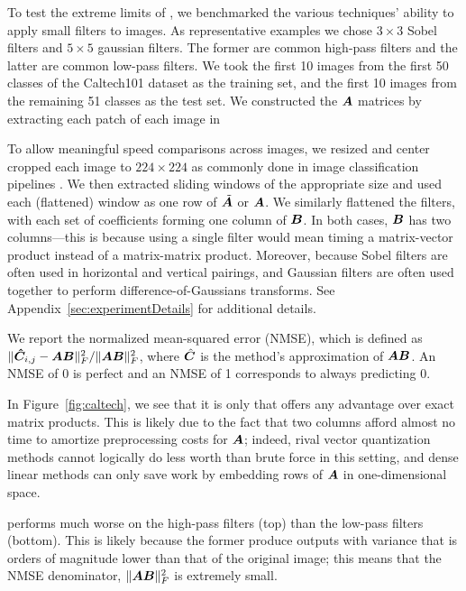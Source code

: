 To test the extreme limits of \ours, we benchmarked the various techniques' ability to apply small filters to images. As representative examples we chose $3 \times 3$ Sobel filters and $5 \times 5$ gaussian filters. The former are common high-pass filters and the latter are common low-pass filters. We took the first 10 images from the first 50 classes of the Caltech101 dataset as the training set, and the first 10 images from the remaining 51 classes as the test set. We constructed the $\bm{A}$ matrices by extracting each patch of each image in

To allow meaningful speed comparisons across images, we resized and center cropped each image to $224 \times 224$ as commonly done in image classification pipelines \cite{resNet,resnet2,densenet}. We then extracted sliding windows of the appropriate size and used each (flattened) window as one row of $\tilde{\bm{A}}$ or $\bm{A}$. We similarly flattened the filters, with each set of coefficients forming one column of $\bm{B}$. In both cases, $\bm{B}$ has two columns---this is because using a single filter would mean timing a matrix-vector product instead of a matrix-matrix product. Moreover, because Sobel filters are often used in horizontal and vertical pairings, and Gaussian filters are often used together to perform difference-of-Gaussians transforms. See Appendix~\ref{sec:experimentDetails} for additional details.

We report the normalized mean-squared error (NMSE), which is defined as $\lVert\bm{\hat{C}}_{i,j} - \bm{A}\bm{B}\rVert^2_F / \lVert\bm{A}\bm{B}\rVert^2_F$, where $\hat{\bm{C}}$ is the method's approximation of $\bm{A}\bm{B}$. An NMSE of 0 is perfect and an NMSE of 1 corresponds to always predicting 0.

In Figure~\ref{fig:caltech}, we see that it is only \oursp that offers any advantage over exact matrix products. This is likely due to the fact that two columns afford almost no time to amortize preprocessing costs for $\bm{A}$; indeed, rival vector quantization methods cannot logically do less worth than brute force in this setting, and dense linear methods can only save work by embedding rows of $\bm{A}$ in one-dimensional space.

\oursp performs much worse on the high-pass filters (top) than the low-pass filters (bottom). This is likely because the former produce outputs with variance that is orders of magnitude lower than that of the original image; this means that the NMSE denominator, $\lVert\bm{A}\bm{B}\rVert^2_F$ is extremely small.%


